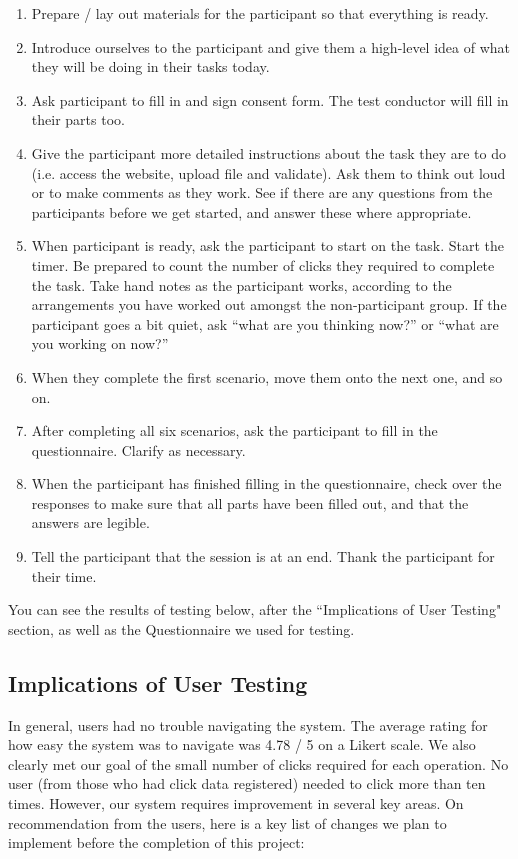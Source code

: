 \documentclass[10pt]{article}
\begin{document}
\begin{enumerate}
\item Prepare / lay out materials for the participant so that everything is ready.
\item Introduce ourselves to the participant and give them a high-level idea of what they will be doing in their tasks today.
\item Ask participant to fill in and sign consent form. The test conductor will fill in their parts too.
\item Give the participant more detailed instructions about the task they are to do (i.e. access the website, upload file and validate). Ask them to think out loud or to make comments as they work. See if there are any questions from the participants before we get started, and answer these where appropriate.
\item When participant is ready, ask the participant to start on the task. Start the timer. Be prepared to count the number of clicks they required to complete the task. Take hand notes as the participant works, according to the arrangements you have worked out amongst the non-participant group. If the participant goes a bit quiet, ask “what are you thinking now?” or “what are you working on now?”
\item When they complete the first scenario, move them onto the next one, and so on.
\item After completing all six scenarios, ask the participant to fill in the questionnaire. Clarify as necessary.
\item When the participant has finished filling in the questionnaire, check over the responses to make sure that all parts have been filled out, and that the answers are legible.
\item Tell the participant that the session is at an end. Thank the participant for their time.
\end{enumerate}

You can see the results of testing below, after the ``Implications of User Testing" section, as well as the Questionnaire we used for testing.

\subsection*{Implications of User Testing}

In general, users had no trouble navigating the system. The average rating for how easy the system was to navigate was 4.78 / 5 on a Likert scale. We also clearly met our goal of the small number of clicks required for each operation. No user (from those who had click data registered) needed to click more than ten times. However, our system requires improvement in several key areas. On recommendation from the users, here is a key list of changes we plan to implement before the completion of this project:
\end{document}
